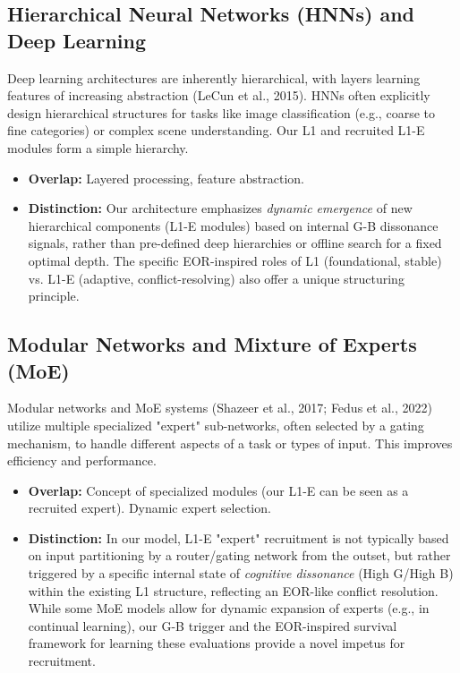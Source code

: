 \documentclass{article}
\begin{document}
\subsection{Hierarchical Neural Networks (HNNs) and Deep Learning}
Deep learning architectures are inherently hierarchical, with layers learning features of increasing abstraction (LeCun et al., 2015). HNNs often explicitly design hierarchical structures for tasks like image classification (e.g., coarse to fine categories) or complex scene understanding. Our L1 and recruited L1-E modules form a simple hierarchy.
\begin{itemize}
    \item \textbf{Overlap:} Layered processing, feature abstraction.
    \item \textbf{Distinction:} Our architecture emphasizes \textit{dynamic emergence} of new hierarchical components (L1-E modules) based on internal G-B dissonance signals, rather than pre-defined deep hierarchies or offline search for a fixed optimal depth. The specific EOR-inspired roles of L1 (foundational, stable) vs. L1-E (adaptive, conflict-resolving) also offer a unique structuring principle.
\end{itemize}

\subsection{Modular Networks and Mixture of Experts (MoE)}
Modular networks and MoE systems (Shazeer et al., 2017; Fedus et al., 2022) utilize multiple specialized "expert" sub-networks, often selected by a gating mechanism, to handle different aspects of a task or types of input. This improves efficiency and performance.
\begin{itemize}
    \item \textbf{Overlap:} Concept of specialized modules (our L1-E can be seen as a recruited expert). Dynamic expert selection.
    \item \textbf{Distinction:} In our model, L1-E "expert" recruitment is not typically based on input partitioning by a router/gating network from the outset, but rather triggered by a specific internal state of \textit{cognitive dissonance} (High G/High B) within the existing L1 structure, reflecting an EOR-like conflict resolution. While some MoE models allow for dynamic expansion of experts (e.g., in continual learning), our G-B trigger and the EOR-inspired survival framework for learning these evaluations provide a novel impetus for recruitment.
\end{itemize}
\end{document}

